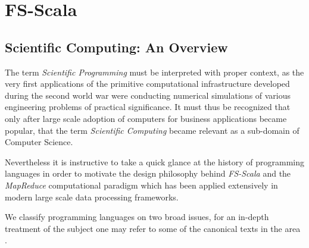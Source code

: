 \chapter{FS-Scala}
\label{cha:2}

\section{Scientific Computing: An Overview}
The term \textit{Scientific Programming} must be interpreted with proper context, as the very first applications of the primitive computational infrastructure developed during the second world war were conducting numerical simulations of various engineering problems of practical significance. It must thus be recognized that only after large scale adoption of computers for business applications became popular, that the term \textit{Scientific Computing} became relevant as a sub-domain of Computer Science.

Nevertheless it is instructive to take a quick glance at the history of programming languages in order to motivate the design philosophy behind \textit{FS-Scala} and the \textit{MapReduce} computational paradigm which has been applied extensively in modern large scale data processing frameworks.

We classify programming languages on two broad issues, for an in-depth treatment of the subject one may refer to some of the canonical texts in the area \cite{Sethi:1989}.


